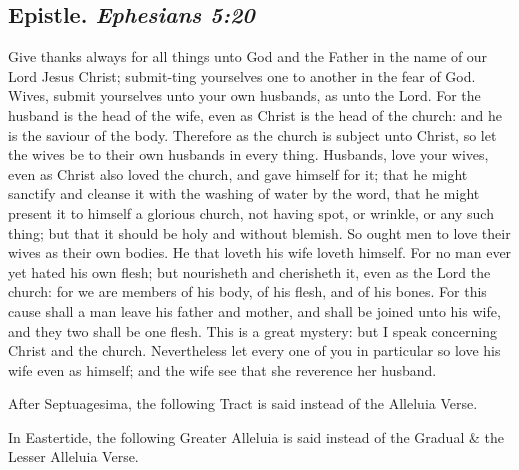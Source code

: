\subsection{Epistle. {\itshape Ephesians 5:20}}
 Give thanks always for all things unto God and the Father in the name of our Lord Jesus Christ; submit-ting yourselves one to another in the fear of God. Wives, submit yourselves unto your own husbands, as unto the Lord. For the husband is the head of the wife, even as Christ is the head of the church: and he is the saviour of the body. Therefore as the church is subject unto Christ, so let the wives be to their own husbands in every thing. Husbands, love your wives, even as Christ also loved the church, and gave himself for it; that he might sanctify and cleanse it with the washing of water by the word, that he might present it to himself a glorious church, not having spot, or wrinkle, or any such thing; but that it should be holy and without blemish. So ought men to love their wives as their own bodies. He that loveth his wife loveth himself. For no man ever yet hated his own flesh; but nourisheth and cherisheth it, even as the Lord the church: for we are members of his body, of his flesh, and of his bones. For this cause shall a man leave his father and mother, and shall be joined unto his wife, and they two shall be one flesh. This is a great mystery: but I speak concerning Christ and the church. Nevertheless let every one of you in particular so love his wife even as himself; and the wife see that she reverence her husband.


\begin{rubric}
    After Septuagesima, the following Tract is said instead of the Alleluia Verse.
\end{rubric}


\begin{rubric}
    In Eastertide, the following Greater Alleluia is said instead of the Gradual \& the Lesser Alleluia Verse.
\end{rubric}


